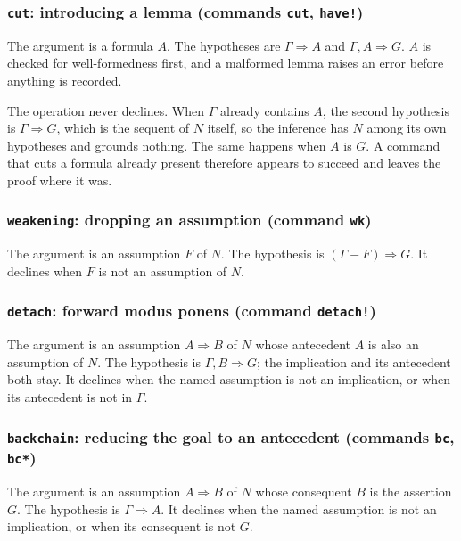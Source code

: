 \subsubsection*{\texttt{cut}: introducing a lemma (commands \texttt{cut},
  \texttt{have!})}

The argument is a formula $A$.  The hypotheses are
$\Gamma \Longrightarrow A$ and $\Gamma, A \Longrightarrow G$.  $A$ is
checked for well-formedness first, and a malformed lemma raises an error
before anything is recorded.

\begin{remark}
The operation never declines.  When $\Gamma$ already contains $A$, the
second hypothesis is $\Gamma \Longrightarrow G$, which is the sequent of
$N$ itself, so the inference has $N$ among its own hypotheses and
grounds nothing.  The same happens when $A$ is $G$.  A command that cuts
a formula already present therefore appears to succeed and leaves the
proof where it was.
\end{remark}

\subsubsection*{\texttt{weakening}: dropping an assumption (command \texttt{wk})}

The argument is an assumption $F$ of $N$.  The hypothesis is
$(\Gamma - F) \Longrightarrow G$.  It declines when $F$ is not an
assumption of $N$.

\subsubsection*{\texttt{detach}: forward modus ponens (command \texttt{detach!})}

The argument is an assumption $A \Rightarrow B$ of $N$ whose antecedent
$A$ is also an assumption of $N$.  The hypothesis is
$\Gamma, B \Longrightarrow G$; the implication and its antecedent both
stay.  It declines when the named assumption is not an implication, or
when its antecedent is not in $\Gamma$.

\subsubsection*{\texttt{backchain}: reducing the goal to an antecedent
  (commands \texttt{bc}, \texttt{bc*})}

The argument is an assumption $A \Rightarrow B$ of $N$ whose consequent
$B$ is the assertion $G$.  The hypothesis is
$\Gamma \Longrightarrow A$.  It declines when the named assumption is not
an implication, or when its consequent is not $G$.

